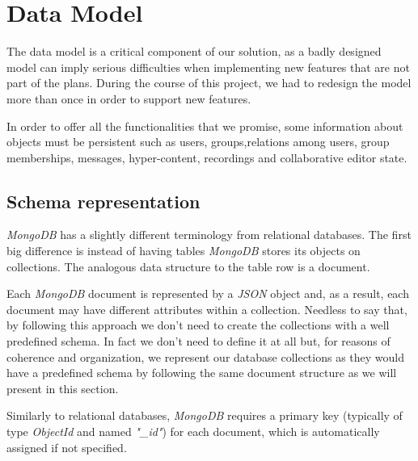 
\section{Data Model}
The data model is a critical component of our solution, as a badly designed model can imply serious difficulties when implementing new features that are not part of the plans. During the course of this project, we had to redesign the model more than once in order to support new features.


In order to offer all the functionalities that we promise, some information about objects must be persistent such as users, groups,relations among users, group memberships, messages, hyper-content, recordings and collaborative editor state.

\subsection {Schema representation}
    \emph{MongoDB} has a slightly different terminology from relational databases. The first big difference is instead of having tables \emph{MongoDB} stores its objects on collections. The analogous data structure to the table row is a document.

    Each \emph{MongoDB} document is represented by a \emph{JSON} object and, as a result, each document may have different attributes within a collection. Needless to say that, by following this approach we don't need to create the collections with a well predefined schema. In fact we don't need to define it at all but, for reasons of coherence and organization, we represent our database collections as they would have a predefined schema by following the same document structure as we will present in this section.

    Similarly to relational databases, \emph{MongoDB} requires a primary key (typically of type \emph{ObjectId} and named \emph{"\_id"}) for each document, which is automatically assigned if not specified. 

